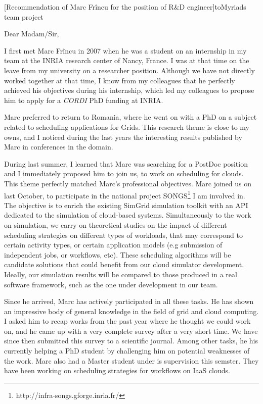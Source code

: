 \documentclass[a4paper,10pt]{article}
\begin{document}

\begin{letter}[Recommendation of Marc Fr\^incu for the position of R\&D engineer]{to}{Myriads team project}

Dear Madam/Sir, 

I first met Marc  Fr\^incu in 2007 when he was a student  on an internship in my
team at the  INRIA research center of Nancy,  France. I was at that  time on the
leave from my university on a researcher position. Although we have not directly
worked  together at  that time,  I  know from  my colleagues  that he  perfectly
achieved  his objectives  during  his  internship, which  led  my colleagues  to
propose him to apply for a \emph{CORDI} PhD funding at INRIA.

Marc preferred to  return to Romania, where he  went on with a PhD  on a subject
related to scheduling applications for Grids. This research theme is close to my
owns, and I  noticed during the last years the  interesting results published by
Marc in conferences in the domain.

During last summer, I learned that Marc was searching for a PostDoc position and
I immediately proposed  him to join us,  to work on scheduling  for clouds. This
theme perfectly matched  Marc's professional objectives. Marc joined  us on last
October,       to      participate       in      the       national      project
SONGS\footnote{http://infra-songs.gforge.inria.fr/}  I  am   involved  in.   The
objective  is to  enrich the  existing SimGrid  simulation toolkit  with an  API
dedicated to the  simulation of cloud-based systems. Simultaneously  to the work
on  simulation, we  carry  on theoretical  studies on  the  impact of  different
scheduling strategies  on different types  of workloads, that may  correspond to
certain  activity  types,  or  certain application  models  (e.g  submission  of
independent  jobs, or  workflows,  etc).  These  scheduling  algorithms will  be
candidate solutions  that could  benefit from  our cloud  simulator development.
Ideally, our  simulation results will  be compared to  those produced in  a real
software framework, such as the one under development in our team.

Since he  arrived, Marc has  actively participated in  all these tasks.   He has
shown an  impressive body of  general knowledge in the  field of grid  and cloud
computing. I  asked him to recap  works from the  past year where he  thought we
could work  on, and he came  up with a very  complete survey after a  very short
time. We  have since then submitted  this survey to a  scientific journal. Among
other  tasks, he  his currently  helping  a PhD  student by  challenging him  on
potential  weaknesses of  the work.  Marc  also had  a Master  student under  is
supervision this  semster. They have  been working on scheduling  strategies for
workflows on IaaS clouds.


\end{letter}
\end{document}
